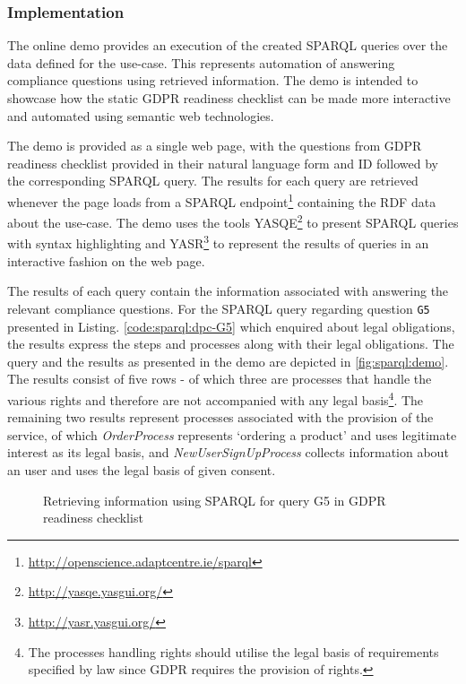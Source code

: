 \subsubsection{Implementation}
The online demo provides an execution of the created SPARQL queries over the data defined for the use-case.
This represents automation of answering compliance questions using retrieved information.
The demo is intended to showcase how the static GDPR readiness checklist can be made more interactive and automated using semantic web technologies.

The demo is provided as a single web page, with the questions from GDPR readiness checklist provided in their natural language form and ID followed by the corresponding SPARQL query.
The results for each query are retrieved whenever the page loads from a
SPARQL endpoint\footnote{\url{http://openscience.adaptcentre.ie/sparql}}
containing the RDF data about the use-case.
The demo uses the tools YASQE\footnote{\url{http://yasqe.yasgui.org/}} to present SPARQL queries with syntax highlighting and YASR\footnote{\url{http://yasr.yasgui.org/}} to represent the results of queries in an interactive fashion on the web page.

The results of each query contain the information associated with answering the relevant compliance questions. For the SPARQL query regarding question \texttt{G5} presented in Listing. \autoref{code:sparql:dpc-G5} which enquired about legal obligations, the results express the steps and processes along with their legal obligations.
The query and the results as presented in the demo are depicted in \autoref{fig:sparql:demo}.
The results consist of five rows - of which three are processes that handle the various rights and therefore are not accompanied with any legal basis\footnote{The processes handling rights should utilise the legal basis of requirements specified by law since GDPR requires the provision of rights.}.
The remaining two results represent processes associated with the provision of the service, of which \textit{OrderProcess} represents `ordering a product' and uses legitimate interest as its legal basis, and \textit{NewUserSignUpProcess} collects information about an user and uses the legal basis of given consent.
\begin{figure}[htbp]
\centering
{}
\caption{Retrieving information using SPARQL for query G5 in GDPR readiness checklist}
\label{fig:sparql:demo}
\end{figure}

